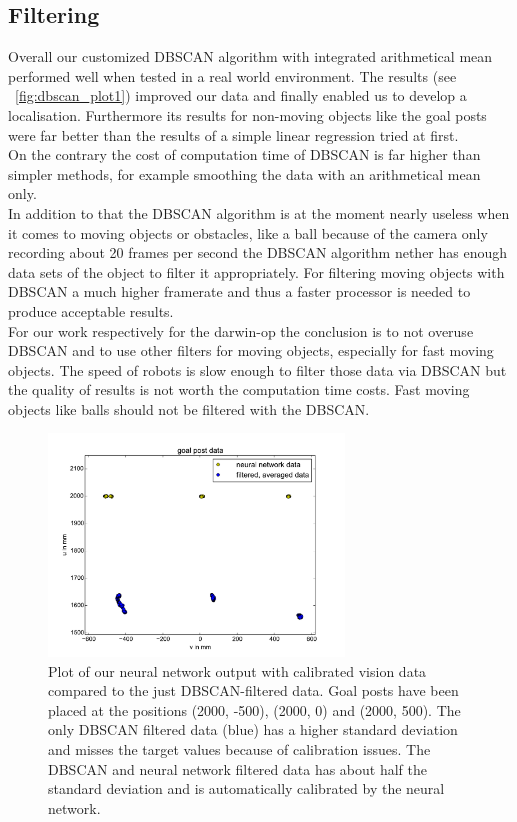 \documentclass[lnicst,a4paper]{svmultln}
\begin{document}
\subsection{Filtering}
\label{sec:results_filtering}
Overall our customized DBSCAN algorithm with integrated arithmetical mean performed well when tested in a real world environment. The results (see ~\ref{fig:dbscan_plot1}) improved our data and finally enabled us to develop a localisation. Furthermore its results for non-moving objects like the goal posts were far better than the results of a simple linear regression tried at first.
\\
On the contrary the cost of computation time of DBSCAN is far higher than simpler methods, for example smoothing the data with an arithmetical mean only.
\\
In addition to that the DBSCAN algorithm is at the moment nearly useless when it comes to moving objects or obstacles, like a ball because of the camera only recording about 20 frames per second the DBSCAN algorithm nether has enough data sets of the object to filter it appropriately. For filtering moving objects with DBSCAN a much higher framerate and thus a faster processor is needed to produce acceptable results.
\\
For our work respectively for the darwin-op the conclusion is to not overuse DBSCAN and to use other filters for moving objects, especially for fast moving objects. The speed of robots is slow enough to filter those data via DBSCAN but the quality of results is not worth the computation time costs. Fast moving objects like balls should not be filtered with the DBSCAN.
\begin{figure}
 	\centerline{\includegraphics[width=0.7\textwidth]{ann_plot1.pdf}}
	{\caption{Plot of our neural network output with calibrated vision data compared to the just DBSCAN-filtered data. Goal posts have been placed at the positions (2000, -500), (2000, 0) and (2000, 500). The only DBSCAN filtered data (blue) has a higher standard deviation and misses the target values because of calibration issues. The DBSCAN and neural network filtered data has about half the standard deviation and is automatically calibrated by the neural network. }\label{fig:ann_plot1}}
\end{figure}
\end{document}
